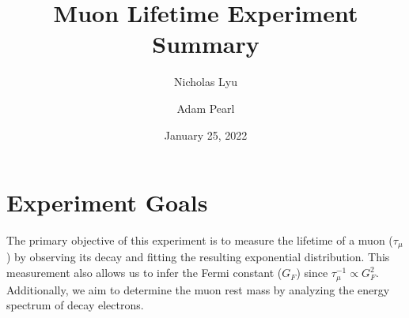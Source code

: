 \documentclass[aps,prb,onecolumn,11pt,superscriptaddress,floatfix,longbibliography]{revtex4-2}
\begin{document}
\title{Muon Lifetime Experiment Summary}

\author{Nicholas Lyu}
\author{Adam Pearl}

\date{January 25, 2022}

\maketitle

\section{\label{sec:goals}Experiment Goals}

The primary objective of this experiment is to measure the lifetime of a muon (\(\tau_\mu\)) by observing its decay and fitting the resulting exponential distribution. This measurement also allows us to infer the Fermi constant (\(G_F\)) since \(\tau_\mu^{-1} \propto G_F^2\). Additionally, we aim to determine the muon rest mass by analyzing the energy spectrum of decay electrons.
\end{document}

